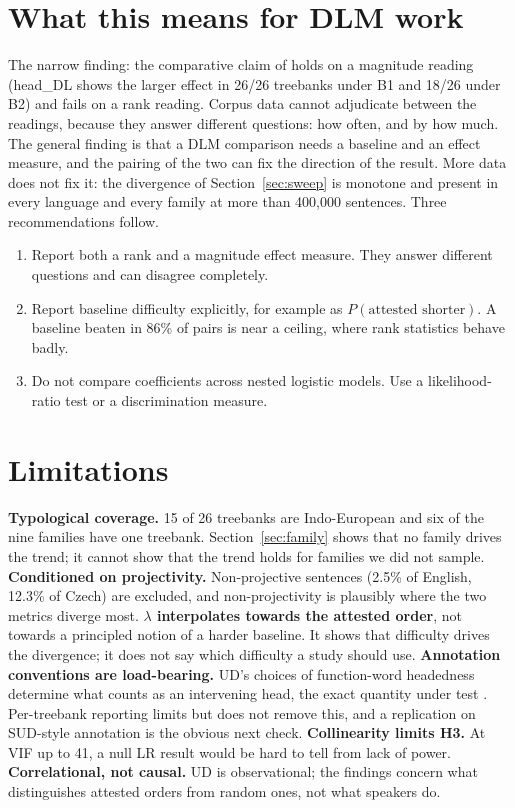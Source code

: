 \documentclass[11pt]{article}
\begin{document}
\section{What this means for DLM work}

The narrow finding: the comparative claim of \citet{yadav2022reappraisal} holds on a magnitude reading (head\_DL shows the larger effect in 26/26 treebanks under B1 and 18/26 under B2) and fails on a rank reading. Corpus data cannot adjudicate between the readings, because they answer different questions: how often, and by how much. The general finding is that a DLM comparison needs a baseline and an effect measure, and the pairing of the two can fix the direction of the result. More data does not fix it: the divergence of Section~\ref{sec:sweep} is monotone and present in every language and every family at more than 400,000 sentences. Three recommendations follow.
\begin{enumerate}
  \item Report both a rank and a magnitude effect measure. They answer different questions and can disagree completely.
  \item Report baseline difficulty explicitly, for example as $P(\text{attested shorter})$. A baseline beaten in 86\% of pairs is near a ceiling, where rank statistics behave badly.
  \item Do not compare coefficients across nested logistic models. Use a likelihood-ratio test or a discrimination measure.
\end{enumerate}

\section{Limitations}

\textbf{Typological coverage.} 15 of 26 treebanks are Indo-European and six of the nine families have one treebank. Section~\ref{sec:family} shows that no family drives the trend; it cannot show that the trend holds for families we did not sample. \textbf{Conditioned on projectivity.} Non-projective sentences (2.5\% of English, 12.3\% of Czech) are excluded, and non-projectivity is plausibly where the two metrics diverge most. \textbf{$\lambda$ interpolates towards the attested order}, not towards a principled notion of a harder baseline. It shows that difficulty drives the divergence; it does not say which difficulty a study should use. \textbf{Annotation conventions are load-bearing.} UD's choices of function-word headedness determine what counts as an intervening head, the exact quantity under test \citep[cf.][]{gerdes2026grammar}. Per-treebank reporting limits but does not remove this, and a replication on SUD-style annotation is the obvious next check. \textbf{Collinearity limits H3.} At VIF up to 41, a null LR result would be hard to tell from lack of power. \textbf{Correlational, not causal.} UD is observational; the findings concern what distinguishes attested orders from random ones, not what speakers do.
\end{document}
